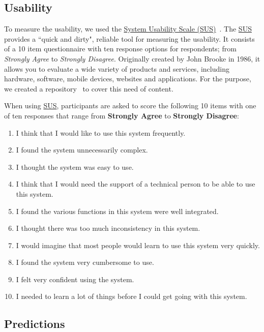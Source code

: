 \subsection{Usability}

To measure the usability, we used the \hyperlink{https://en.wikipedia.org/wiki/System_usability_scale}{System Usability Scale (SUS)}~\cite{orfanou2015perceived}. The \hyperlink{https://en.wikipedia.org/wiki/System_usability_scale}{SUS} provides a ``quick and dirty", reliable tool for measuring the usability. It consists of a 10 item questionnaire with ten response options for respondents; from {\it Strongly Agree} to {\it Strongly Disagree}. Originally created by John Brooke in 1986, it allows you to evaluate a wide variety of products and services, including hardware, software, mobile devices, websites and applications. For the purpose, we created a repository~\cite{https://doi.org/10.13140/rg.2.2.26978.79044, francisco_maria_calisto_2018_1435042} to cover this need of content.

\clearpage

When using \hyperlink{https://en.wikipedia.org/wiki/System_usability_scale}{SUS}, participants are asked to score the following 10 items with one of ten responses that range from {\bf Strongly Agree} to {\bf Strongly Disagree}:

\begin{enumerate}
\item I think that I would like to use this system frequently.
\item I found the system unnecessarily complex.
\item I thought the system was easy to use.
\item I think that I would need the support of a technical person to be able to use this system.
\item I found the various functions in this system were well integrated.
\item I thought there was too much inconsistency in this system.
\item I would imagine that most people would learn to use this system very quickly.
\item I found the system very cumbersome to use.
\item I felt very confident using the system.
\item I needed to learn a lot of things before I could get going with this system.
\end{enumerate}

\subsection{Predictions}


